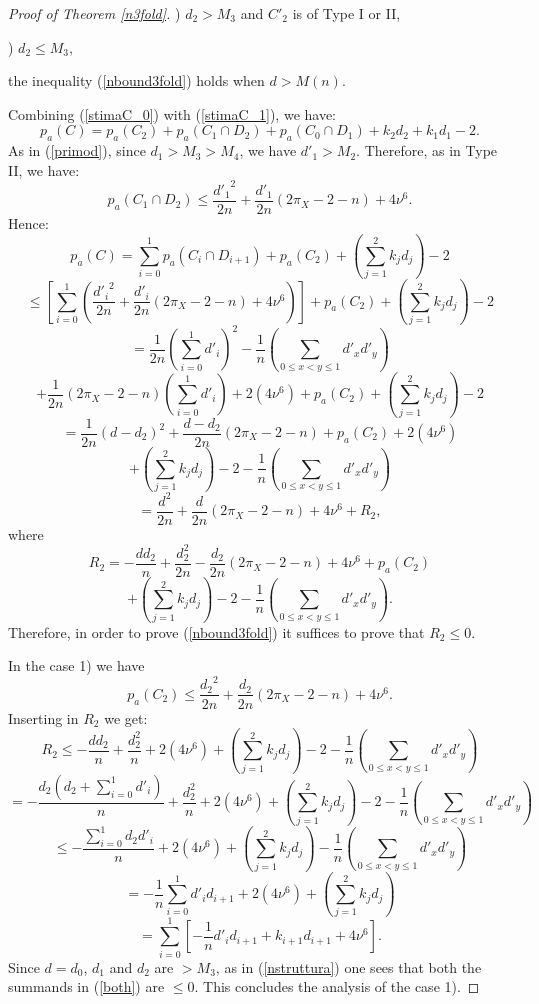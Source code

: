 \documentclass[9pt,a4paper]{amsart}
\theoremstyle{plain}
\theoremstyle{definition}
\theoremstyle{remark}
\begin{document}
\begin{proof}[Proof of Theorem \ref{n3fold}]
) $d_2>M_3$ and $C'_2$ is of Type I or II,



) $d_2\leq M_3$,

the inequality (\ref{nbound3fold}) holds when $d>M(n)$.

\smallskip
Combining (\ref{stimaC_0}) with (\ref{stimaC_1}), we have:
$$
p_a(C)=p_a(C_2)+p_a(C_1\cap D_2)+p_a(C_0\cap D_1)+k_2d_2+k_1d_1-2.
$$
As in (\ref{primod}), since $d_1>M_3>M_4$, we have $d'_1>M_2$.
Therefore, as in Type II, we have:
$$
p_a(C_1\cap D_2)\leq
\frac{{d'_1}^2}{2n}+\frac{d'_1}{2n}(2\pi_X-2-n)+4\nu^6.
$$
Hence:
$$
p_a(C)=\sum_{i=0}^{1}p_a(C_i\cap
D_{i+1})+p_a(C_2)+\left(\sum_{j=1}^{2}k_jd_j\right)-2
$$
$$
\leq
\left[\sum_{i=0}^{1}\left(\frac{{d'_i}^2}{2n}+\frac{d'_i}{2n}(2\pi_X-2-n)+4\nu^6\right)\right]+p_a(C_2)+\left(\sum_{j=1}^{2}k_jd_j\right)-2
$$
$$
=\frac{1}{2n}\left(\sum_{i=0}^{1}{d'_i}\right)^2
-\frac{1}{n}\left(\sum_{0\leq x<y\leq 1}d'_xd'_y\right)
$$
$$
+\frac{1}{2n}(2\pi_X-2-n)\left(\sum_{i=0}^{1}d'_i\right)+2(4\nu^6)+p_a(C_2)+\left(\sum_{j=1}^{2}k_jd_j\right)-2
$$
$$
=\frac{1}{2n}(d-d_2)^2+\frac{d-d_2}{2n}(2\pi_X-2-n)+p_a(C_2)+2(4\nu^6)
$$
$$
+\left(\sum_{j=1}^{2}k_jd_j\right)-2-\frac{1}{n}\left(\sum_{0\leq
x<y\leq 1}d'_xd'_y\right)
$$
$$
=\frac{{d}^2}{2n}+\frac{d}{2n}(2\pi_X-2-n)+4\nu^6+R_2,
$$
where
$$
R_2=-\frac{dd_2}{n}+\frac{d_2^2}{2n}-\frac{d_2}{2n}(2\pi_X-2-n)+4\nu^6+p_a(C_2)
$$
$$
+\left(\sum_{j=1}^{2}k_jd_j\right)-2-\frac{1}{n}\left(\sum_{0\leq
x<y\leq 1}d'_xd'_y\right).
$$
Therefore, in order to prove (\ref{nbound3fold}) it suffices to prove
that $R_2\leq 0$.

\smallskip
In the case 1) we have
$$
p_a(C_2)\leq \frac{{d_2}^2}{2n}+\frac{d_2}{2n}(2\pi_X-2-n)+4\nu^6.
$$
Inserting in $R_2$ we get:
$$
R_2\leq
-\frac{dd_2}{n}+\frac{d_2^2}{n}+2(4\nu^6)+\left(\sum_{j=1}^{2}k_jd_j\right)-2-\frac{1}{n}\left(\sum_{0\leq
x<y\leq 1}d'_xd'_y\right)
$$
$$
=-\frac{d_2(d_2+\sum_{i=0}^{1}d'_i)}{n}+\frac{d_2^2}{n}+2(4\nu^6)+\left(\sum_{j=1}^{2}k_jd_j\right)-2-\frac{1}{n}\left(\sum_{0\leq
x<y\leq 1}d'_xd'_y\right)
$$
$$
\leq
-\frac{\sum_{i=0}^{1}d_2d'_i}{n}+2(4\nu^6)+\left(\sum_{j=1}^{2}k_jd_j\right)-\frac{1}{n}\left(\sum_{0\leq
x<y\leq 1}d'_xd'_y\right)
$$
$$
=-\frac{1}{n}\sum_{i=0}^{1}d'_id_{i+1}+2(4\nu^6)+\left(\sum_{j=1}^{2}k_jd_j\right)
$$
\begin{equation}\label{both}
=\sum_{i=0}^{1}\left[-\frac{1}{n}d'_id_{i+1}+k_{i+1}d_{i+1}+4\nu^6\right].
\end{equation}
Since $d=d_0$, $d_1$ and $d_2$ are $>M_3$, as in (\ref{nstruttura})
one sees that both the summands in (\ref{both}) are $\leq 0$. This
concludes the analysis of the case 1).



\end{proof}
\end{document}
